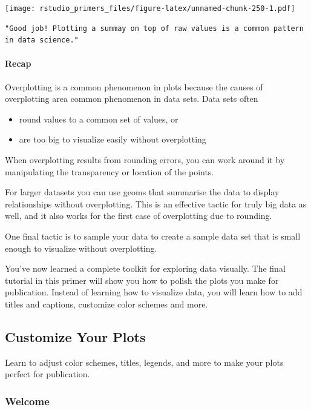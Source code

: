 \documentclass[
]{article}
\providecommand{\tightlist}{%
  \setlength{\itemsep}{0pt}\setlength{\parskip}{0pt}}
\begin{document}
\texttt{[image: rstudio\_primers\_files/figure-latex/unnamed-chunk-250-1.pdf]}

\begin{verbatim}
"Good job! Plotting a summay on top of raw values is a common pattern in data science."
\end{verbatim}

\hypertarget{recap-8}{%
\paragraph{Recap}\label{recap-8}}

Overplotting is a common phenomenon in plots because the causes of
overplotting area common phenomenon in data sets. Data sets often

\begin{itemize}
\tightlist
\item
  round values to a common set of values, or
\item
  are too big to visualize easily without overplotting
\end{itemize}

When overplotting results from rounding errors, you can work around it
by manipulating the transparency or location of the points.

For larger datasets you can use geoms that summarise the data to display
relationships without overplotting. This is an effective tactic for
truly big data as well, and it also works for the first case of
overplotting due to rounding.

One final tactic is to sample your data to create a sample data set that
is small enough to visualize without overplotting.

You've now learned a complete toolkit for exploring data visually. The
final tutorial in this primer will show you how to polish the plots you
make for publication. Instead of learning how to visualize data, you
will learn how to add titles and captions, customize color schemes and
more.

\hypertarget{customize-your-plots}{%
\subsection{Customize Your Plots}\label{customize-your-plots}}

Learn to adjust color schemes, titles, legends, and more to make your
plots perfect for publication.

\hypertarget{welcome-12}{%
\subsubsection{Welcome}\label{welcome-12}}
\end{document}
